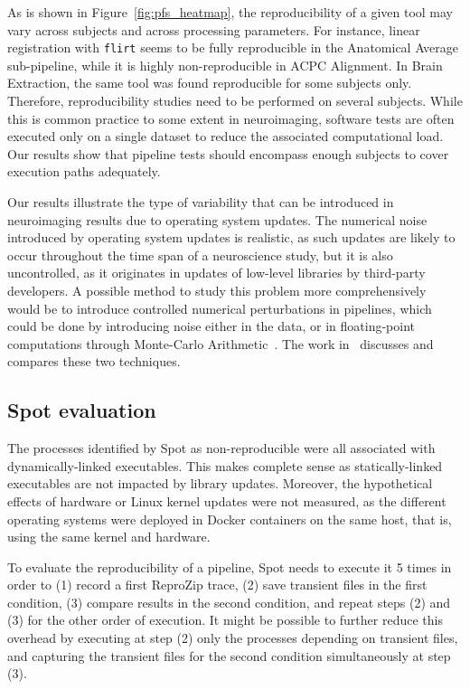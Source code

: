 \documentclass[a4paper,num-refs]{oup-contemporary}
\newcommand{\revised}[1]{\color{blue}#1\color{black}\xspace}
\newcommand{\reprozip}[0]{ReproZip\xspace}
\newcommand{\toolname}[0]{Spot\xspace}
\newcommand{\flirt}[0]{\texttt{flirt}\xspace}
\begin{document}
As is shown in Figure~\ref{fig:pfs_heatmap}, the reproducibility of
a given tool may vary across subjects and across processing parameters. For
instance, linear registration with \flirt seems to be fully reproducible in
the Anatomical Average sub-pipeline, while it is highly non-reproducible in
ACPC Alignment. In Brain Extraction, the same tool was found reproducible
for some subjects only. Therefore, reproducibility studies need to be
performed on several subjects. While this is common practice to some extent in neuroimaging,
software tests are often executed only on a single dataset to reduce the
associated computational load. Our results show that pipeline tests should
encompass enough subjects to cover execution paths adequately.

Our results illustrate the type of variability that can be introduced in
 neuroimaging results due to operating system updates. The
 numerical noise introduced by operating system updates is realistic, as
 such updates are likely to occur throughout the time span of a
 neuroscience study, but it is also uncontrolled, as it originates in
 updates of low-level libraries by third-party developers. A possible
 method to study this problem more comprehensively would be to introduce
 controlled numerical perturbations in pipelines, which could be done by
 introducing noise either in the data, or in floating-point computations
 through Monte-Carlo Arithmetic~\cite{Parker1997-qq}. The work
 in~\cite{kiar2020comparing} discusses and compares these two techniques.

\subsection{\toolname evaluation}

The processes identified by \toolname as non-reproducible were all
associated with dynamically-linked executables.
This makes complete sense as statically-linked executables are not
impacted by library updates. Moreover, the hypothetical effects of
hardware or Linux kernel updates were not measured, as the different
operating systems were deployed in Docker containers on the same host, that
is, using the same kernel and hardware.

\revised{
To evaluate the reproducibility of a pipeline, \toolname needs to execute it 5 times 
in order to (1) record a first \reprozip trace, (2) save transient files in the first condition, 
(3) compare results in the second condition, and repeat steps (2) and (3) for the other order of execution. 
It might be possible to further reduce this overhead by executing at step (2) only the processes 
depending on transient files, and capturing the transient files for the second condition simultaneously at step (3).}
\end{document}
